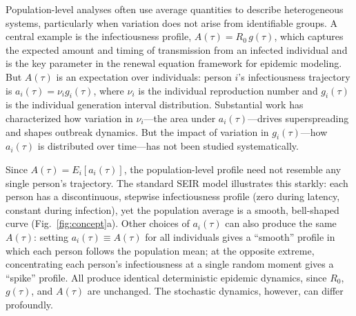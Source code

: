 \documentclass[10pt]{article}
\begin{document}

Population-level analyses often use average quantities to describe heterogeneous systems, particularly when variation does not arise from identifiable groups\citep{lloyd-smith_superspreading_2005}. A central example is the infectiousness profile, $A(\tau) = R_0 \, g(\tau)$, which captures the expected amount and timing of transmission from an infected individual and is the key parameter in the renewal equation framework for epidemic modeling\citep{wallinga_how_2007, breda_formulation_2012}. But $A(\tau)$ is an expectation over individuals: person $i$'s infectiousness trajectory is $a_i(\tau) = \nu_i g_i(\tau)$, where $\nu_i$ is the individual reproduction number and $g_i(\tau)$ is the individual generation interval distribution\citep{champredon_intrinsic_2015, svensson_note_2007}. Substantial work has characterized how variation in $\nu_i$---the area under $a_i(\tau)$---drives superspreading and shapes outbreak dynamics\citep{lloyd-smith_superspreading_2005}. But the impact of variation in $g_i(\tau)$---how $a_i(\tau)$ is distributed over time---has not been studied systematically.

Since $A(\tau) = E_i[a_i(\tau)]$, the population-level profile need not resemble any single person's trajectory. The standard SEIR model illustrates this starkly: each person has a discontinuous, stepwise infectiousness profile (zero during latency, constant during infection), yet the population average is a smooth, bell-shaped curve (Fig.~\ref{fig:concept}a). Other choices of $a_i(\tau)$ can also produce the same $A(\tau)$: setting $a_i(\tau) \equiv A(\tau)$ for all individuals gives a ``smooth'' profile in which each person follows the population mean; at the opposite extreme, concentrating each person's infectiousness at a single random moment gives a ``spike'' profile. All produce identical deterministic epidemic dynamics, since $R_0$, $g(\tau)$, and $A(\tau)$ are unchanged. The stochastic dynamics, however, can differ profoundly.
\end{document}
